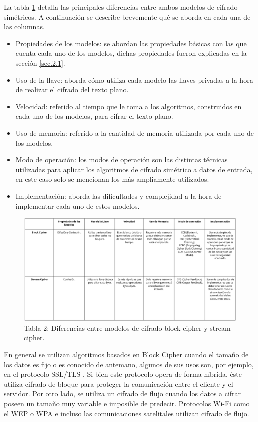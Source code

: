 \documentclass[a4paper,10pt]{article}
\begin{document}
	 La tabla \ref{Diferencias_Block_Stream_Cipher} detalla las principales diferencias entre ambos modelos de cifrado simétricos. A continuación se describe brevemente qué se aborda en cada una de las columnas.
	\begin{itemize}
		\item Propiedades de los modelos: se abordan las propiedades básicas con las que cuenta cada uno de los modelos, dichas propiedades fueron explicadas en la sección \ref{sec.2.1}.
		\item Uso de la llave: aborda cómo utiliza cada modelo las llaves privadas a la hora de realizar el cifrado del texto plano.
		\item Velocidad: referido al tiempo que le toma a los algoritmos, construidos en cada uno de los modelos, para cifrar el texto plano.
		\item Uso de memoria: referido a la cantidad de memoria utilizada por cada uno de los modelos.
		\item Modo de operación: los modos de operación son las distintas técnicas utilizadas para aplicar los algoritmos de cifrado simétrico a datos de entrada, en este caso solo se mencionan los más ampliamente utilizados.
		\item Implementación: aborda las dificultades y complejidad a la hora de implementar cada uno de estos modelos.
	\end{itemize}
	\begin{figure}[h]
		\centering
		\includegraphics[width=1.0\textwidth]{tablaBlockStreamCipher.PNG}
		\caption{Tabla 2: Diferencias entre modelos de cifrado block cipher y stream cipher.}
		\label{Diferencias_Block_Stream_Cipher}
	\end{figure}
	En general se utilizan algoritmos basados en Block Cipher cuando el tamaño de los datos es fijo o es conocido de antemano, algunos de sus usos son, por ejemplo, en el protocolo SSL/TLS \parencite{davies2011implementing}. Si bien este protocolo opera de forma híbrida, éste utiliza cifrado de bloque para proteger la comunicación entre el cliente y el servidor. Por otro lado, se utiliza un cifrado de flujo cuando los datos a cifrar poseen un tamaño muy variable e imposible de predecir. Protocolos Wi-Fi como el WEP o WPA e incluso las comunicaciones satelitales utilizan cifrado de flujo.
	
\end{document}
